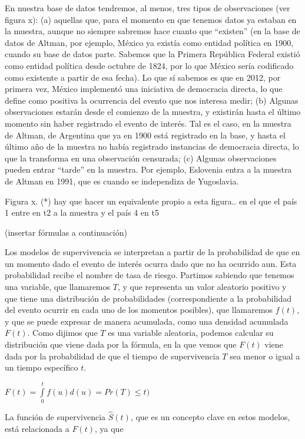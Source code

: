 \documentclass[]{book}
\begin{document}
En nuestra base de datos tendremos, al menos, tres tipos de
observaciones (ver figura x): (a) aquellas que, para el momento en que
tenemos datos ya estaban en la muestra, aunque no siempre sabremos hace
cuanto que ``existen'' (en la base de datos de Altman, por ejemplo,
México ya existía como entidad política en 1900, cuando su base de datos
parte. Sabemos que la Primera República Federal existió como entidad
política desde octubre de 1824, por lo que México sería codificado como
existente a partir de esa fecha). Lo que sí sabemos es que en 2012, por
primera vez, México implementó una iniciativa de democracia directa, lo
que define como positiva la ocurrencia del evento que nos interesa
medir; (b) Algunas observaciones estarán desde el comienzo de la
muestra, y existirán hasta el último momento sin haber registrado el
evento de interés. Tal es el caso, en la muestra de Altman, de Argentina
que ya en 1900 está registrado en la base, y hasta el último año de la
muestra no había registrado instancias de democracia directa, lo que la
transforma en una observación censurada; (c) Algunas observaciones
pueden entrar ``tarde'' en la muestra. Por ejemplo, Eslovenia entra a la
muestra de Altman en 1991, que es cuando se independiza de Yugoslavia.

Figura x. (*) hay que hacer un equivalente propio a esta figura.. en el
que el país 1 entre en t2 a la muestra y el país 4 en t5

(insertar fórmulas a continuación)

Los modelos de supervivencia se interpretan a partir de la probabilidad
de que en un momento dado el evento de interés ocurra dado que no ha
ocurrido aun. Esta probabilidad recibe el nombre de tasa de riesgo.
Partimos sabiendo que tenemos una variable, que llamaremos \(T\), y que
representa un valor aleatorio positivo y que tiene una distribución de
probabilidades (correspondiente a la probabilidad del evento ocurrir en
cada uno de los momentos posibles), que llamaremos \(f(t)\), y que se
puede expresar de manera acumulada, como una densidad acumulada
\(F(t)\). Como dijimos que \(T\) es una variable aleatoria, podemos
calcular su distribución que viene dada por la fórmula, en la que vemos
que \(F(t)\) viene dada por la probabilidad de que el tiempo de
supervivencia \(T\) sea menor o igual a un tiempo específico \(t\).

\(F(t)=\int\limits_0^t f(u)d(u)=Pr(T)\leq t)\)

La función de supervivencia \(\hat S(t)\), que es un concepto clave en
estos modelos, está relacionada a \(F(t)\), ya que
\end{document}

